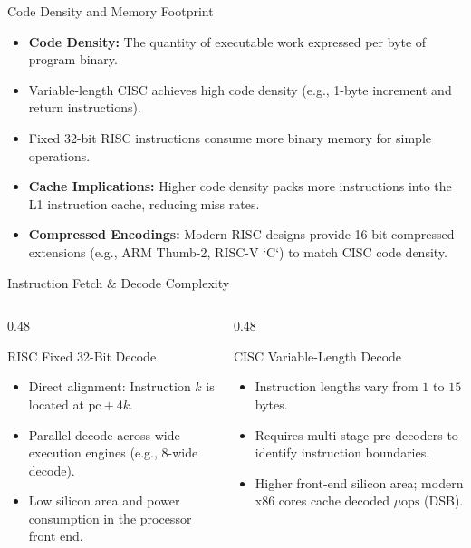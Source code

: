 \documentclass[aspectratio=169,11pt,t]{beamer}
\newcommand{\key}[1]{\textbf{#1}}
\begin{document}
\begin{frame}{Code Density and Memory Footprint}
\large
\begin{itemize}\setlength{\itemsep}{8pt}
  \item \key{Code Density:} The quantity of executable work expressed per byte of program binary.
  \item Variable-length CISC achieves high code density (e.g., 1-byte increment and return instructions).
  \item Fixed 32-bit RISC instructions consume more binary memory for simple operations.
  \item \key{Cache Implications:} Higher code density packs more instructions into the L1 instruction cache, reducing miss rates.
  \item \key{Compressed Encodings:} Modern RISC designs provide 16-bit compressed extensions (e.g., ARM Thumb-2, RISC-V `C`) to match CISC code density.
\end{itemize}
\end{frame}


\begin{frame}{Instruction Fetch \& Decode Complexity}
\begin{columns}[T,onlytextwidth]
\begin{column}{0.48\textwidth}
\begin{block}{RISC Fixed 32-Bit Decode}
\begin{itemize}\setlength{\itemsep}{5pt}
  \item Direct alignment: Instruction $k$ is located at $\text{pc} + 4k$.
  \item Parallel decode across wide execution engines (e.g., 8-wide decode).
  \item Low silicon area and power consumption in the processor front end.
\end{itemize}
\end{block}
\end{column}

\begin{column}{0.48\textwidth}
\begin{block}{CISC Variable-Length Decode}
\begin{itemize}\setlength{\itemsep}{5pt}
  \item Instruction lengths vary from $1$ to $15$ bytes.
  \item Requires multi-stage pre-decoders to identify instruction boundaries.
  \item Higher front-end silicon area; modern x86 cores cache decoded $\mu\text{ops}$ (DSB).
\end{itemize}
\end{block}
\end{column}
\end{columns}
\end{frame}
\end{document}
